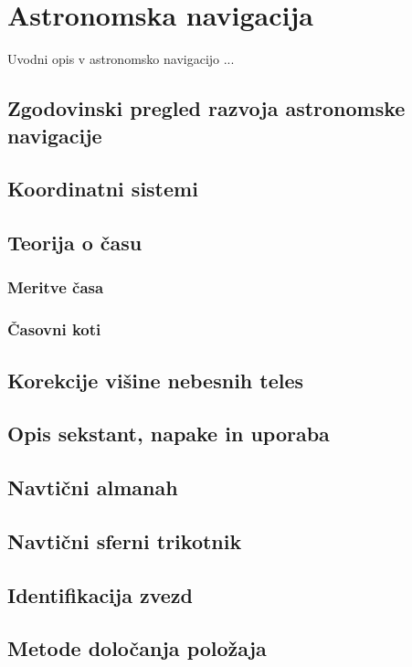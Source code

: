 \chapter{Astronomska navigacija}

Uvodni opis v astronomsko navigacijo ...

\section{Zgodovinski pregled razvoja astronomske navigacije}

\section{Koordinatni sistemi}

\section{Teorija o času}
\subsection{Meritve časa}
\subsection{Časovni koti}


\section{Korekcije višine nebesnih teles}

\section{Opis sekstant, napake in uporaba}

\section{Navtični almanah}

\section{Navtični sferni trikotnik}

\section{Identifikacija zvezd}

\section{Metode določanja položaja}
